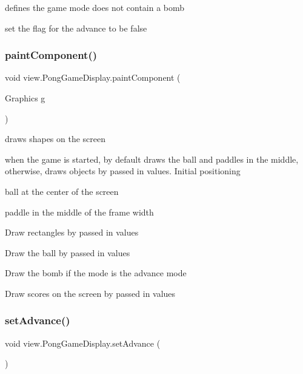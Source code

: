defines the game mode does not contain a bomb 

set the flag for the advance to be false \hypertarget{classview_1_1_pong_game_display_a0e3a18dfc9bbd76c97439a618a3330ac}{}\label{classview_1_1_pong_game_display_a0e3a18dfc9bbd76c97439a618a3330ac} 
\subsubsection{\texorpdfstring{paint\+Component()}{paintComponent()}}
{\footnotesize\ttfamily void view.\+Pong\+Game\+Display.\+paint\+Component (\begin{DoxyParamCaption}\item[{Graphics}]{g }\end{DoxyParamCaption})\hspace{0.3cm}{\ttfamily [protected]}}



draws shapes on the screen 

when the game is started, by default draws the ball and paddles in the middle, otherwise, draws objects by passed in values. Initial positioning
\begin{DoxyItemize}
\item ball at the center of the screen
\item paddle in the middle of the frame width
\end{DoxyItemize}

Draw rectangles by passed in values

Draw the ball by passed in values

Draw the bomb if the mode is the advance mode

Draw scores on the screen by passed in values\hypertarget{classview_1_1_pong_game_display_a0fedbf41897932915b12f67542cb7695}{}\label{classview_1_1_pong_game_display_a0fedbf41897932915b12f67542cb7695} 
\subsubsection{\texorpdfstring{set\+Advance()}{setAdvance()}}
{\footnotesize\ttfamily void view.\+Pong\+Game\+Display.\+set\+Advance (\begin{DoxyParamCaption}{ }\end{DoxyParamCaption})}



